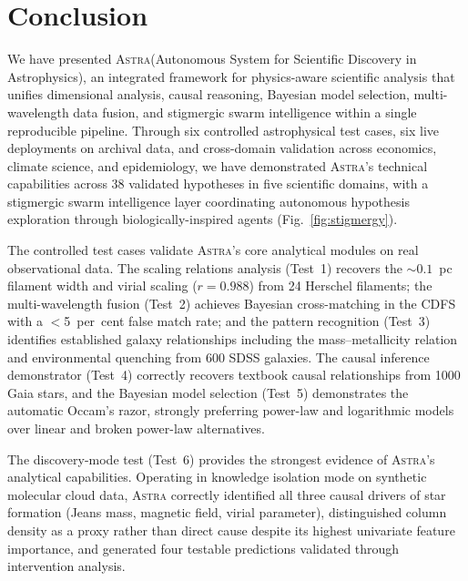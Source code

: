 \documentclass[usenatbib]{rasti}
\newcommand{\astra}{\textsc{Astra}\xspace}
\begin{document}
\section{Conclusion}
\label{sec:conclusion}

We have presented \astra (Autonomous System for Scientific Discovery in Astrophysics), an integrated framework for physics-aware scientific analysis that unifies dimensional analysis, causal reasoning, Bayesian model selection, multi-wavelength data fusion, and stigmergic swarm intelligence within a single reproducible pipeline.
Through six controlled astrophysical test cases, six live deployments on archival data, and cross-domain validation across economics, climate science, and epidemiology, we have demonstrated \astra's technical capabilities across 38 validated hypotheses in five scientific domains, with a stigmergic swarm intelligence layer coordinating autonomous hypothesis exploration through biologically-inspired agents (Fig.~\ref{fig:stigmergy}).

The controlled test cases validate \astra's core analytical modules on real observational data.
The scaling relations analysis (Test~1) recovers the ${\sim}0.1$~pc filament width and virial scaling ($r = 0.988$) from 24 Herschel filaments; the multi-wavelength fusion (Test~2) achieves Bayesian cross-matching in the CDFS with a $<$5~per~cent false match rate; and the pattern recognition (Test~3) identifies established galaxy relationships including the mass--metallicity relation and environmental quenching from 600 SDSS galaxies.
The causal inference demonstrator (Test~4) correctly recovers textbook causal relationships from 1000 Gaia stars, and the Bayesian model selection (Test~5) demonstrates the automatic Occam's razor, strongly preferring power-law and logarithmic models over linear and broken power-law alternatives.

The discovery-mode test (Test~6) provides the strongest evidence of \astra's analytical capabilities.
Operating in knowledge isolation mode on synthetic molecular cloud data, \astra correctly identified all three causal drivers of star formation (Jeans mass, magnetic field, virial parameter), distinguished column density as a proxy rather than direct cause despite its highest univariate feature importance, and generated four testable predictions validated through intervention analysis.
\end{document}

